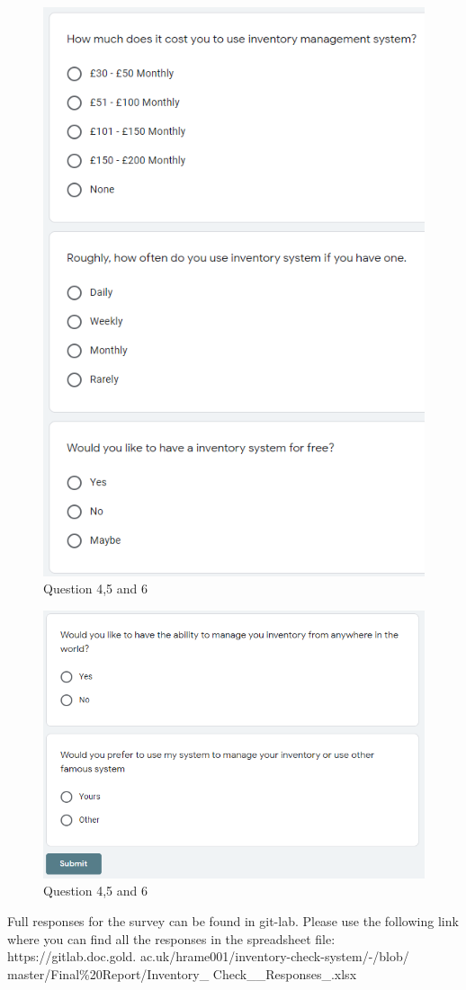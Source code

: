 \newpage
\begin{figure}[h]
\centering
    \includegraphics[scale=0.673]
    {images/survey2.png}
    \caption{Question 4,5 and 6}
    \label{fig: Question 4,5 and 6}
\end{figure}

\newpage
\begin{figure}[h]
\centering
    \includegraphics[scale=0.9]
    {images/survey3.png}
    \caption{Question 4,5 and 6}
    \label{fig: Question 4,5 and 6}
\end{figure}

Full responses for the survey can be found in git-lab. Please use the following link where you can find all the responses in the spreadsheet file: https://gitlab.doc.gold. ac.uk/hrame001/inventory-check-system/-/blob/ master/Final\%20Report/Inventory\_ Check\_\_Responses\_.xlsx